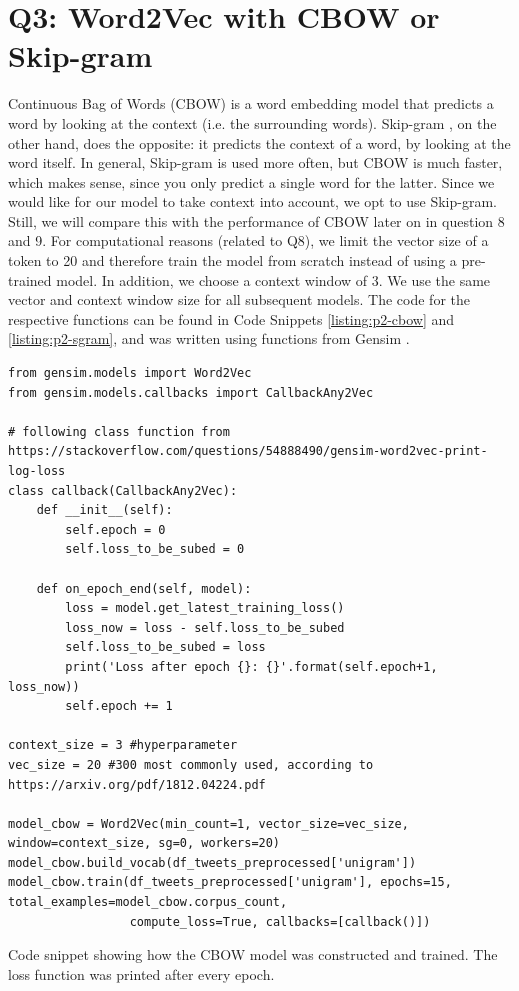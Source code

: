 \section*{Q3: Word2Vec with CBOW or Skip-gram}
Continuous Bag of Words (CBOW) \cite{cbowsgram} is a word embedding model that predicts a word by looking at the context (i.e. the surrounding words). Skip-gram \cite{cbowsgram}, on the other hand, does the opposite: it predicts the context of a word, by looking at the word itself. In general, Skip-gram is used more often, but CBOW is much faster, which makes sense, since you only predict a single word for the latter. Since we would like for our model to take context into account, we opt to use Skip-gram. Still, we will compare this with the performance of CBOW later on in question 8 and 9. For computational reasons (related to Q8), we limit the vector size of a token to 20 and therefore train the model from scratch instead of using a pre-trained model. In addition, we choose a context window of 3. We use the same vector and context window size for all subsequent models. The code for the respective functions can be found in Code Snippets \ref{listing:p2-cbow} and \ref{listing:p2-sgram}, and was written using functions from Gensim \cite{gensim}.

\begin{listing*}
\begin{verbatim}
from gensim.models import Word2Vec
from gensim.models.callbacks import CallbackAny2Vec

# following class function from https://stackoverflow.com/questions/54888490/gensim-word2vec-print-log-loss
class callback(CallbackAny2Vec):
    def __init__(self):
        self.epoch = 0
        self.loss_to_be_subed = 0

    def on_epoch_end(self, model):
        loss = model.get_latest_training_loss()
        loss_now = loss - self.loss_to_be_subed
        self.loss_to_be_subed = loss
        print('Loss after epoch {}: {}'.format(self.epoch+1, loss_now))
        self.epoch += 1
        
context_size = 3 #hyperparameter
vec_size = 20 #300 most commonly used, according to https://arxiv.org/pdf/1812.04224.pdf

model_cbow = Word2Vec(min_count=1, vector_size=vec_size, window=context_size, sg=0, workers=20)
model_cbow.build_vocab(df_tweets_preprocessed['unigram'])
model_cbow.train(df_tweets_preprocessed['unigram'], epochs=15, total_examples=model_cbow.corpus_count,
                 compute_loss=True, callbacks=[callback()])
\end{verbatim}
\caption{Code snippet showing how the CBOW model was constructed and trained. The loss function was printed after every epoch.}
\label{listing:p2-cbow}
\end{listing*}

